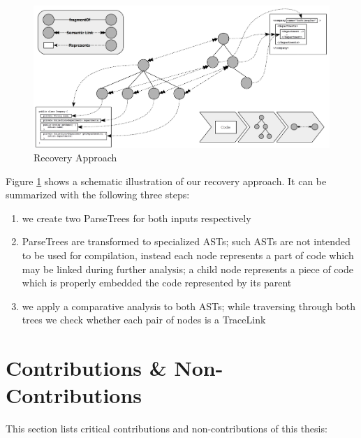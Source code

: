 \begin{figure}[h!]
\begin{center}
\includegraphics[width=\textwidth]{images/RecoveryExample.png}
\end{center}
\caption{Recovery Approach}
\label{figure:RecoveryApproach}
\end{figure}
Figure \ref{figure:RecoveryApproach} shows a schematic illustration of our recovery approach.
It can be summarized with the following three steps:
\begin{enumerate}
\item
we create two \glspl{ParseTree} for both inputs respectively
\item
\glspl{ParseTree} are transformed to specialized \glspl{AST};
such \glspl{AST} are not intended to be used for compilation, instead each node represents a part of code which may be linked during further analysis;
a child node represents a piece of code which is properly embedded the code represented by its parent
\item
we apply a comparative analysis to both \glspl{AST};
while traversing through both trees we check whether each pair of nodes is a \gls{TraceLink}
\end{enumerate}

\section{Contributions \& Non-Contributions}
\label{section:ContributionsAndNonContributions}
This section lists critical contributions and non-contributions of this thesis:

